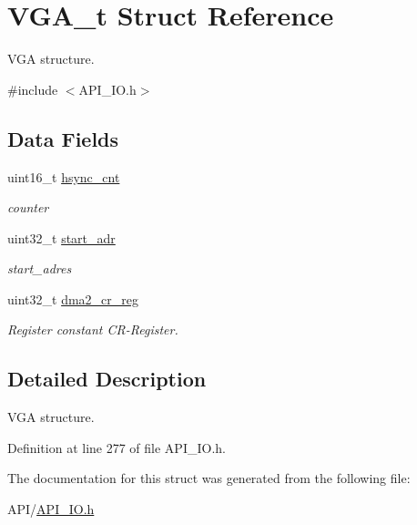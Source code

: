 \hypertarget{struct_v_g_a__t}{}\section{V\+G\+A\+\_\+t Struct Reference}
\label{struct_v_g_a__t}


V\+GA structure.  




{\ttfamily \#include $<$A\+P\+I\+\_\+\+I\+O.\+h$>$}

\subsection*{Data Fields}
\begin{DoxyCompactItemize}
\item 
\mbox{\label{struct_v_g_a__t_a649bc185f93377aec7fa1c136dd2add0}} 
uint16\+\_\+t \hyperlink{struct_v_g_a__t_a649bc185f93377aec7fa1c136dd2add0}{hsync\+\_\+cnt}
\begin{DoxyCompactList}\small\item\em counter \end{DoxyCompactList}\item 
\mbox{\label{struct_v_g_a__t_a7f47a855ae47844b419d75797f00fbbb}} 
uint32\+\_\+t \hyperlink{struct_v_g_a__t_a7f47a855ae47844b419d75797f00fbbb}{start\+\_\+adr}
\begin{DoxyCompactList}\small\item\em start\+\_\+adres \end{DoxyCompactList}\item 
\mbox{\label{struct_v_g_a__t_a1fc3c1405cc22f5d4fc21eb58c47c06a}} 
uint32\+\_\+t \hyperlink{struct_v_g_a__t_a1fc3c1405cc22f5d4fc21eb58c47c06a}{dma2\+\_\+cr\+\_\+reg}
\begin{DoxyCompactList}\small\item\em Register constant C\+R-\/\+Register. \end{DoxyCompactList}\end{DoxyCompactItemize}


\subsection{Detailed Description}
V\+GA structure. 

Definition at line 277 of file A\+P\+I\+\_\+\+I\+O.\+h.



The documentation for this struct was generated from the following file\+:\begin{DoxyCompactItemize}
\item 
A\+P\+I/\hyperlink{_a_p_i___i_o_8h}{A\+P\+I\+\_\+\+I\+O.\+h}\end{DoxyCompactItemize}

